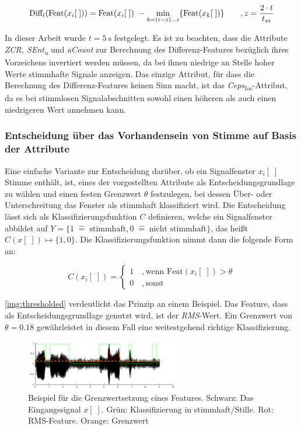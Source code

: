 \begin{equation}
\text{Diff}_t(\text{Feat}(x_i[\;])) = \text{Feat}(x_i[\;])\ - \operatorname*{min}_{k=(i-z)...i}\{\text{Feat}(x_k[\;])\} \qquad , z = \frac{2 \cdot t}{t_{xi}}
\label{eq:difFeature}
\end{equation}

In dieser Arbeit wurde $t = \SI{5}{\second}$ festgelegt. Es ist zu beachten, dass die Attribute \emph{ZCR, SEnt\textsubscript{u}} und \emph{aCount} zur Berechnung des Differenz-Features bezüglich ihres Vorzeichens invertiert werden müssen, da bei ihnen niedrige an Stelle hoher Werte stimmhafte Signale anzeigen. Das einzige Attribut, für dass die Berechnung des Differenz-Features keinen Sinn macht, ist das \emph{Ceps\textsubscript{loc}}-Attribut, da es bei stimmlosen Signalabschnitten sowohl einen höheren als auch einen niedrigeren Wert annehmen kann.

\subsubsection{Entscheidung über das Vorhandensein von Stimme auf Basis der Attribute}

Eine einfache Variante zur Entscheidung darüber, ob ein Signalfenster $x_i[\;]$ Stimme enthält, ist, eines der vorgestellten Attribute als Entscheidungsgrundlage zu wählen und einen festen Grenzwert $\theta$ festzulegen, bei dessen Über- oder Unterschreitung das Fenster als stimmhaft klassifiziert wird. Die Entscheidung lässt sich als Klassifizierungsfunktion $C$ definieren, welche ein Signalfenster abbildet auf $Y = \{ 1 \; \hat{=} \; \text{stimmhaft}, 0 \; \hat{=} \; \text{nicht stimmhaft}\}$, das heißt $C(x[\;]) \mapsto \{1,0\}$. Die Klassifizierungsfunktion nimmt dann die folgende Form an:

\begin{equation}
	C(x_i[\;]) = 
\begin{cases}
1 \quad , \text{wenn Feat}(x_i[\;]) > \theta \\
0 \quad , \text{sonst}
 \end{cases}
\end{equation}

\autoref{img:thresholded} verdeutlicht das Prinzip an einem Beispiel. Das Feature, dass als Entscheidungsgrundlage genutzt wird, ist der \emph{RMS}-Wert. Ein Grenzwert von $\theta = 0.18$ gewährleistet in diesem Fall eine weitestgehend richtige Klassifizierung.

\begin{figure}[h]
	\centering
	\includegraphics[width=0.6\textwidth]{bilder/thresholded02.png}
	\caption[Beispiel für die Grenzwertsetzung eines Features]{Beispiel für die Grenzwertsetzung eines Features. Schwarz: Das Eingangssignal $x[\;]$. Grün: Klassifizierung in stimmhaft/Stille. Rot: RMS-Feature. Orange: Grenzwert}
	\label{img:thresholded}
\end{figure}

